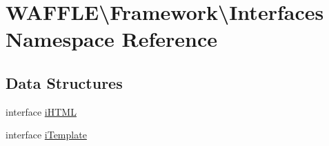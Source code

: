 \hypertarget{namespace_w_a_f_f_l_e_1_1_framework_1_1_interfaces}{}\section{W\+A\+F\+F\+LE\textbackslash{}Framework\textbackslash{}Interfaces Namespace Reference}
\label{namespace_w_a_f_f_l_e_1_1_framework_1_1_interfaces}
\subsection*{Data Structures}
\begin{DoxyCompactItemize}
\item 
interface \hyperlink{interface_w_a_f_f_l_e_1_1_framework_1_1_interfaces_1_1i_h_t_m_l}{i\+H\+T\+ML}
\item 
interface \hyperlink{interface_w_a_f_f_l_e_1_1_framework_1_1_interfaces_1_1i_template}{i\+Template}
\end{DoxyCompactItemize}
